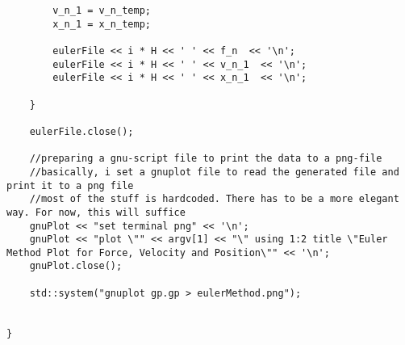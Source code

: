 \documentclass[11pt]{article}
\begin{document}
\begin{lstlisting}
		v_n_1 = v_n_temp;
		x_n_1 = x_n_temp;

		eulerFile << i * H << ' ' << f_n  << '\n';
		eulerFile << i * H << ' ' << v_n_1  << '\n';
		eulerFile << i * H << ' ' << x_n_1  << '\n';

	}

	eulerFile.close();

	//preparing a gnu-script file to print the data to a png-file
	//basically, i set a gnuplot file to read the generated file and print it to a png file
	//most of the stuff is hardcoded. There has to be a more elegant way. For now, this will suffice
	gnuPlot << "set terminal png" << '\n';
	gnuPlot << "plot \"" << argv[1] << "\" using 1:2 title \"Euler Method Plot for Force, Velocity and Position\"" << '\n';
	gnuPlot.close();

	std::system("gnuplot gp.gp > eulerMethod.png");


}
\end{lstlisting}
\end{document}
